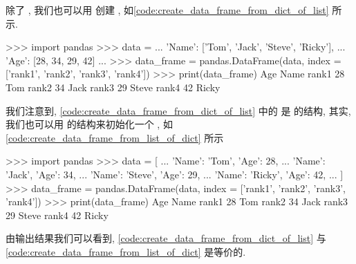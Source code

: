 除了 , 我们也可以用  创建 , 如\cref{code:create_data_frame_from_dict_of_list} 所示.%
%
\begin{codebox}[
  label = code:create_data_frame_from_dict_of_list,
  caption = 利用 \inlinetext{dict} 创建 \inlinetext{DataFrame},
]
>>> import pandas
>>> data = {
...     'Name': ['Tom', 'Jack', 'Steve', 'Ricky'],
...     'Age':  [28,    34,     29,      42]
... }
>>> data_frame = pandas.DataFrame(data, index = ['rank1', 'rank2', 'rank3', 'rank4'])
>>> print(data_frame)
       Age   Name
rank1   28    Tom
rank2   34   Jack
rank3   29  Steve
rank4   42  Ricky
\end{codebox}%
%
我们注意到, \cref{code:create_data_frame_from_dict_of_list} 中的  是  的结构, 其实, 我们也可以用  的结构来初始化一个 , 如\cref{code:create_data_frame_from_list_of_dict} 所示
\begin{codebox}[
  label = code:create_data_frame_from_list_of_dict,
  caption = 利用 \inlinetext{dict} 创建 \inlinetext{DataFrame},
]
>>> import pandas
>>> data = [
...     {'Name': 'Tom',   'Age': 28},
...     {'Name': 'Jack',  'Age': 34},
...     {'Name': 'Steve', 'Age': 29},
...     {'Name': 'Ricky', 'Age': 42},
... ]
>>> data_frame = pandas.DataFrame(data, index = ['rank1', 'rank2', 'rank3', 'rank4'])
>>> print(data_frame)
       Age   Name
rank1   28    Tom
rank2   34   Jack
rank3   29  Steve
rank4   42  Ricky
\end{codebox}%
%
由输出结果我们可以看到, \cref{code:create_data_frame_from_dict_of_list} 与\cref{code:create_data_frame_from_list_of_dict} 是等价的.


